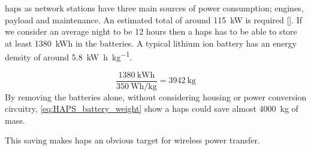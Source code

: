 \gls{haps} as network stations have three main sources of power consumption; engines, payload and maintenance. An estimated total of around \SI{115}{kW} is required []. If we consider an average night to be 12 hours then a \gls{haps} has to be able to store at least \SI{1380}{kWh} in the batteries. A typical lithium ion battery has an energy density of around \SI{5,8}{\kilo\watt\hour\per\kilogram}. 

\begin{equation} \label{eq:HAPS_battery_weight}
	\frac{\SI{1380}{\kilo\watt\hour}}{\SI{350}{\watt\hour\per\kilogram}} = \SI{3942}{\kilogram}
\end{equation}
By removing the batteries alone, without considering housing or power conversion circuitry, \autoref{eq:HAPS_battery_weight} show a \gls{haps} could save almost \SI{4000}{\kilogram} of mass.

This saving makes \gls{haps} an obvious target for wireless power transfer.